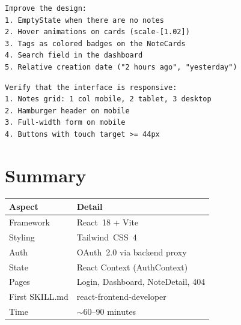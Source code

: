 \begin{praticabox}[title={Hands-On --- Improve the appearance}]
\begin{lstlisting}[language={}]
Improve the design:
1. EmptyState when there are no notes
2. Hover animations on cards (scale-[1.02])
3. Tags as colored badges on the NoteCards
4. Search field in the dashboard
5. Relative creation date ("2 hours ago", "yesterday")
\end{lstlisting}
\end{praticabox}

\begin{praticabox}[title={Hands-On --- Responsive design}]
\begin{lstlisting}[language={}]
Verify that the interface is responsive:
1. Notes grid: 1 col mobile, 2 tablet, 3 desktop
2. Hamburger header on mobile
3. Full-width form on mobile
4. Buttons with touch target >= 44px
\end{lstlisting}
\end{praticabox}

\section*{Summary}

\begin{center}
\begin{tabularx}{\textwidth}{l X}
\toprule
\textbf{Aspect} & \textbf{Detail} \\
\midrule
Framework & React~18 + Vite \\
Styling & Tailwind~CSS~4 \\
Auth & OAuth~2.0 via backend proxy \\
State & React Context (AuthContext) \\
Pages & Login, Dashboard, NoteDetail, 404 \\
First SKILL.md & react-frontend-developer \\
Time & $\sim$60--90 minutes \\
\bottomrule
\end{tabularx}
\end{center}
